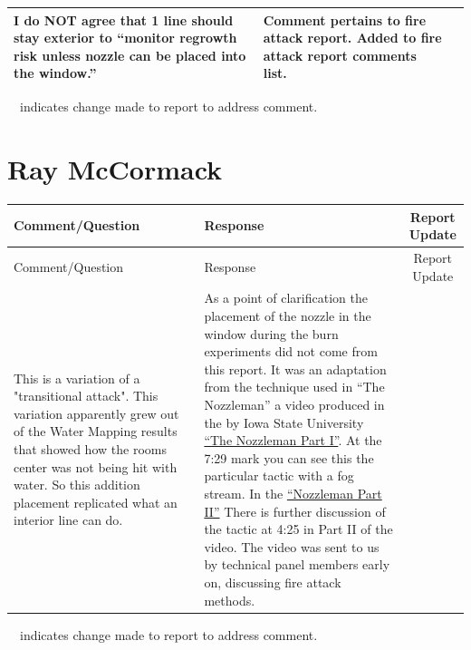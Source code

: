 \documentclass[12pt,oneside]{book}
\begin{document}
\begin{landscape}
\begin{longtable}{|L{4in}|L{3.75in}|c|}
 		\hline
 		I do NOT agree that 1 line should stay exterior to ``monitor regrowth risk unless nozzle can be placed into the window.'' &
 		Comment pertains to fire attack report. Added to fire attack report comments list. & \\

 		\hline
\end{longtable}
\checkmark~~indicates change made to report to address comment.

\newpage

\section{Ray McCormack}
\begin{longtable}{|L{4in}|L{3.75in}|c|}

		\hline
		Comment/Question & Response & Report Update \\ 
		\toprule[1.0pt] \endfirsthead
		\hline
		Comment/Question & Response & Report Update \\ 
		\toprule[1.0pt] \endhead
		\hline
		This is a variation of a "transitional attack". This variation apparently grew out of the Water Mapping results that showed how the rooms center was not being hit with water. So this addition placement replicated what an interior line can do. &
		As a point of clarification the placement of the nozzle in the window during the burn experiments did not come from this report. It was an adaptation from the technique used in ``The Nozzleman'' a video produced in the by Iowa State University \href{https://www.youtube.com/watch?v=cBd9i2bQmaQ&t=449}{``The Nozzleman Part I''}. At the 7:29 mark you can see this the particular tactic with a fog stream. In the \href{https://www.youtube.com/watch?v=hbMWNf9Eq7c&t=265s}{``Nozzleman Part II''} There is further discussion of the tactic at 4:25 in Part II of the video. The video was sent to us by technical panel members early on, discussing fire attack methods. & \\
		\hline

\end{longtable}
\checkmark~~indicates change made to report to address comment.




\end{landscape}
\end{document}
